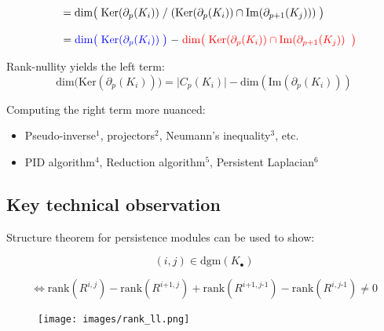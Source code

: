\documentclass[
  letterpaper,
  DIV=11,
  numbers=noendperiod,
  oneside]{scrartcl}
\providecommand{\tightlist}{%
  \setlength{\itemsep}{0pt}\setlength{\parskip}{0pt}}\usepackage{longtable,booktabs,array}
\begin{document}
\(\;\quad\quad\quad\hphantom{\beta_p^{i,j} }= \mathrm{dim}\big(\; \mathrm{Ker}(\partial_p(K_i)) \; / \; (\mathrm{Ker}(\partial_p(K_i)) \cap \mathrm{Im}(\partial_{p+1}(K_j))) \; \big )\)

\(\;\quad\quad\quad\hphantom{\beta_p^{i,j}}=\color{blue}{\mathrm{dim}\big(\;\mathrm{Ker}(\partial_p(K_i)) \; \big)} \; \color{black}{-} \; \color{red}{\mathrm{dim}\big( \; \mathrm{Ker}(\partial_p(K_i)) \cap \mathrm{Im}(\partial_{p+1}(K_j))\;\; \big)}\)

Rank-nullity yields the {left term}: \[
\mathrm{dim}\big(\mathrm{Ker}(\partial_p(K_i))\big) = \lvert C_p(K_i) \rvert - \mathrm{dim}(\mathrm{Im}(\partial_p(K_i)))
\]

Computing the {right term} more nuanced:

\begin{itemize}
\tightlist
\item
  Pseudo-inverse\(^1\), projectors\(^2\), Neumann's inequality\(^3\),
  etc.
\item
  PID algorithm\(^4\), Reduction algorithm\(^5\), Persistent
  Laplacian\(^6\)
\end{itemize}


\subsection{Key technical observation}\label{key-technical-observation}

Structure theorem for persistence modules can be used to show:

\[ 
(i,j) \in \mathrm{dgm}(K_\bullet)
\]

\[
\Leftrightarrow \mathrm{rank}(R^{i,j}) - \mathrm{rank}(R^{i\texttt{+}1,j}) + \mathrm{rank}(R^{i\texttt{+}1,j\text{-}1}) - \mathrm{rank}(R^{i,j\text{-}1}) \neq 0
\]

\begin{figure}

{\centering \texttt{[image: images/rank\_ll.png]}

}

\end{figure}
\end{document}
